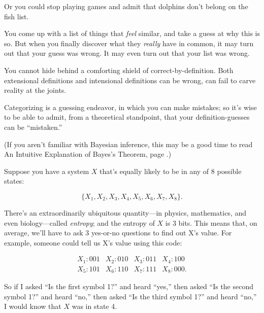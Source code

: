 {
 Or you could stop playing games and admit that dolphins
don't belong on the fish list.}

{
 You come up with a list of things that \textit{feel} similar, and
take a guess at why this is so. But when you finally discover what they
\textit{really} have in common, it may turn out that your guess was
wrong. It may even turn out that your list was wrong.}

{
 You cannot hide behind a comforting shield of
correct-by-definition. Both extensional definitions and intensional
definitions can be wrong, can fail to carve reality at the joints.}

{
 Categorizing is a guessing endeavor, in which you can make
mistakes; so it's wise to be able to admit, from a
theoretical standpoint, that your definition-guesses can be
``mistaken.''}

\myendsectiontext


{
 (If you aren't familiar with Bayesian inference,
this may be a good time to read An Intuitive Explanation of
Bayes's Theorem, page \pageref{intuitive_bayesian}.) }

{
 Suppose you have a system $X$ that's equally likely
to be in any of 8 possible states:}

\begin{equation*}
\{X_{1},X_{2}, X_{3}, X_{4}, X_{5}, X_{6}, X_{7}, X_{8} \}.
\end{equation*}

{
 There's an extraordinarily ubiquitous
quantity---in physics, mathematics, and even biology---called
\textit{entropy}; and the entropy of $X$ is 3 bits. This means that, on
average, we'll have to ask 3 yes-or-no questions to
find out X's value. For example, someone could tell us
X's value using this code:}

\begin{equation*}
  \begin{array}{llll}
 X_{1} : 001 &  X_{2} : 010 &  X_{3} : 011 &  X_{4} : 100 \\
 X_{5} : 101 &  X_{6} : 110 &  X_{7} : 111 &  X_{8} : 000.
 \end{array}
\end{equation*}


\bigskip

{
 So if I asked ``Is the first symbol
1?'' and heard
``yes,'' then asked
``Is the second symbol 1?'' and
heard ``no,'' then asked
``Is the third symbol 1?'' and heard
``no,'' I would know that $X$ was in
state 4.}

